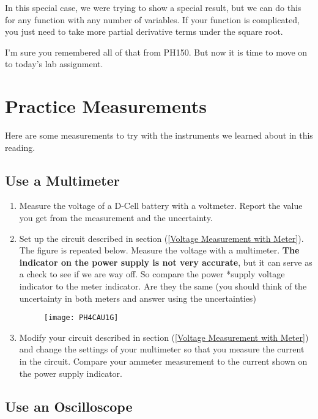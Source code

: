 In this special case, we were trying to show a special result, but we can do this for any function with any number of variables. If your function is complicated, you just need to take more partial derivative terms under the square root.

I'm sure you remembered all of that from PH150. But now it is time to move on to today's lab assignment.
\vfill
\pagebreak
\section{Practice Measurements}
Here are some measurements to try with the instruments we learned about in this reading.

\subsection{Use a Multimeter}

\begin{enumerate}
\item Measure the voltage of a D-Cell battery with a voltmeter. Report the value you get from the measurement and the uncertainty.

\item Set up the circuit described in section (\ref{Voltage Measurement with Meter}). The figure is repeated below. Measure the voltage with a multimeter. \textbf{The indicator on the power supply is not very accurate}, but it can serve as a check to see if we are way off. So compare the power *supply voltage indicator to the meter indicator. Are they the same (you should think of the uncertainty in both meters and answer using the uncertainties)

\begin{figure}[h!]
	\centering
    \texttt{[image: PH4CAU1G]}  
\end{figure}

\item Modify your circuit described in section (\ref{Voltage Measurement with Meter}) and change the settings of your multimeter so that you measure the current in the circuit. Compare your ammeter measurement to the current shown on the power supply indicator.
\end{enumerate}

\subsection{Use an Oscilloscope}

